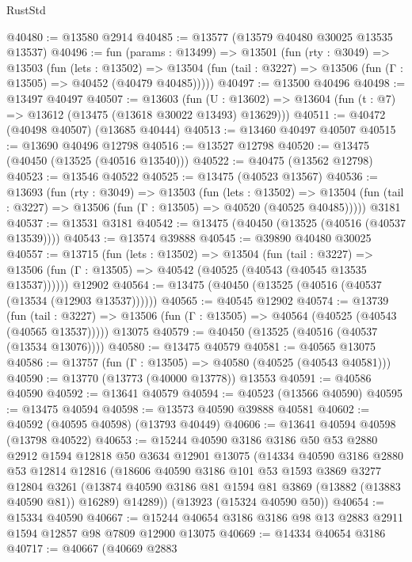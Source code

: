 \begin{lexlean}{RustStd}
\begin{coremodule}
@40480 := @13580 @2914
@40485 := @13577 (@13579 @40480 @30025 @13535 @13537)
@40496 := fun (params : @13499) =>
  @13501
    (fun (rty : @3049) =>
    @13503
      (fun (lets : @13502) =>
      @13504 (fun (tail : @3227) => @13506 (fun (Γ : @13505) => @40452 (@40479 @40485)))))
@40497 := @13500 @40496
@40498 := @13497 @40497
@40507 := @13603
    (fun (U : @13602) => @13604 (fun (t : @7) => @13612 (@13475 (@13618 @30022 @13493) @13629)))
@40511 := @40472 (@40498 @40507) (@13685 @40444)
@40513 := @13460 @40497 @40507
@40515 := @13690 @40496 @12798
@40516 := @13527 @12798
@40520 := @13475 (@40450 (@13525 (@40516 @13540)))
@40522 := @40475 (@13562 @12798)
@40523 := @13546 @40522
@40525 := @13475 (@40523 @13567)
@40536 := @13693
    (fun (rty : @3049) =>
    @13503
      (fun (lets : @13502) =>
      @13504 (fun (tail : @3227) => @13506 (fun (Γ : @13505) => @40520 (@40525 @40485)))))
    @3181
@40537 := @13531 @3181
@40542 := @13475 (@40450 (@13525 (@40516 (@40537 @13539))))
@40543 := @13574 @39888
@40545 := @39890 @40480 @30025
@40557 := @13715
    (fun (lets : @13502) =>
    @13504
      (fun (tail : @3227) =>
      @13506 (fun (Γ : @13505) => @40542 (@40525 (@40543 (@40545 @13535 @13537))))))
    @12902
@40564 := @13475 (@40450 (@13525 (@40516 (@40537 (@13534 (@12903 @13537))))))
@40565 := @40545 @12902
@40574 := @13739
    (fun (tail : @3227) => @13506 (fun (Γ : @13505) => @40564 (@40525 (@40543 (@40565 @13537)))))
    @13075
@40579 := @40450 (@13525 (@40516 (@40537 (@13534 @13076))))
@40580 := @13475 @40579
@40581 := @40565 @13075
@40586 := @13757 (fun (Γ : @13505) => @40580 (@40525 (@40543 @40581)))
@40590 := @13770 (@13773 (@40000 @13778)) @13553
@40591 := @40586 @40590
@40592 := @13641 @40579
@40594 := @40523 (@13566 @40590)
@40595 := @13475 @40594
@40598 := @13573 @40590 @39888 @40581
@40602 := @40592 (@40595 @40598) (@13793 @40449)
@40606 := @13641 @40594 @40598 (@13798 @40522)
@40653 := @15244
    @40590
    @3186
    @3186
    @50
    @53
    @2880
    @2912
    @1594
    @12818
    @50
    @3634
    @12901
    @13075
    (@14334
      @40590
      @3186
      @2880
      @53
      @12814
      @12816
      (@18606
        @40590
        @3186
        @101
        @53
        @1593
        @3869
        @3277
        @12804
        @3261
        (@13874 @40590 @3186 @81 @1594 @81 @3869 (@13882 (@13883 @40590 @81)) @16289)
        @14289))
    (@13923 (@15324 @40590 @50))
@40654 := @15334 @40590
@40667 := @15244 @40654 @3186 @3186 @98 @13 @2883 @2911 @1594 @12857 @98 @7809 @12900 @13075
@40669 := @14334 @40654 @3186
@40717 := @40667
    (@40669
      @2883

\end{coremodule}
\end{lexlean}
